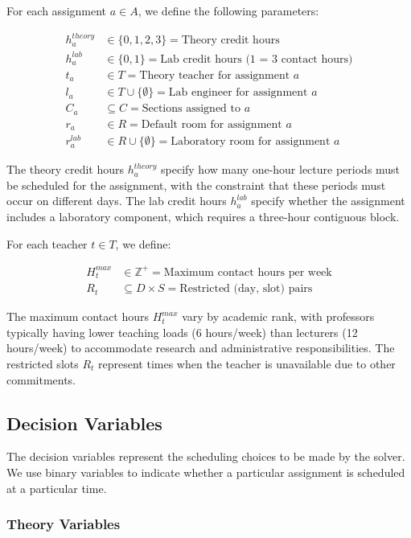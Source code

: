 \documentclass[12pt,a4paper]{article}
\begin{document}
For each assignment $a \in A$, we define the following parameters:

\begin{align*}
h_a^{theory} &\in \{0, 1, 2, 3\} = \text{Theory credit hours} \\
h_a^{lab} &\in \{0, 1\} = \text{Lab credit hours (1 = 3 contact hours)} \\
t_a &\in T = \text{Theory teacher for assignment } a \\
l_a &\in T \cup \{\emptyset\} = \text{Lab engineer for assignment } a \\
C_a &\subseteq C = \text{Sections assigned to } a \\
r_a &\in R = \text{Default room for assignment } a \\
r_a^{lab} &\in R \cup \{\emptyset\} = \text{Laboratory room for assignment } a
\end{align*}

The theory credit hours $h_a^{theory}$ specify how many one-hour lecture periods must be scheduled for the assignment, with the constraint that these periods must occur on different days. The lab credit hours $h_a^{lab}$ specify whether the assignment includes a laboratory component, which requires a three-hour contiguous block.

For each teacher $t \in T$, we define:

\begin{align*}
H_t^{max} &\in \mathbb{Z}^+ = \text{Maximum contact hours per week} \\
R_t &\subseteq D \times S = \text{Restricted (day, slot) pairs}
\end{align*}

The maximum contact hours $H_t^{max}$ vary by academic rank, with professors typically having lower teaching loads (6 hours/week) than lecturers (12 hours/week) to accommodate research and administrative responsibilities. The restricted slots $R_t$ represent times when the teacher is unavailable due to other commitments.

\subsection{Decision Variables}

The decision variables represent the scheduling choices to be made by the solver. We use binary variables to indicate whether a particular assignment is scheduled at a particular time.

\subsubsection{Theory Variables}
\end{document}
